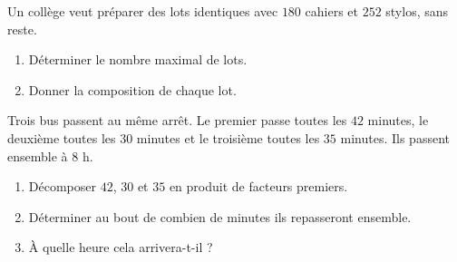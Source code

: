 \documentclass[a4paper,10pt]{report}
\begin{document}
\begin{ex}
Un collège veut préparer des lots identiques avec $180$ cahiers et $252$ stylos, sans reste.
\begin{enumerate}
\item Déterminer le nombre maximal de lots.
\item Donner la composition de chaque lot.
\end{enumerate}
\end{ex}

\begin{ex}
Trois bus passent au même arrêt. Le premier passe toutes les $42$ minutes, le deuxième toutes les $30$ minutes et le troisième toutes les $35$ minutes.
Ils passent ensemble à $8$ h.
\begin{enumerate}
\item Décomposer $42$, $30$ et $35$ en produit de facteurs premiers.
\item Déterminer au bout de combien de minutes ils repasseront ensemble.
\item À quelle heure cela arrivera-t-il ?
\end{enumerate}
\end{ex}
\end{document}
